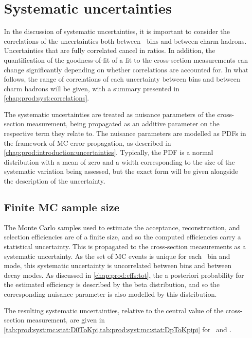 \chapter{Systematic uncertainties}
\label{chap:prod:syst}

In the discussion of systematic uncertainties, it is important to consider the 
correlations of the uncertainties both between \pTy\ bins and between charm 
hadrons.
Uncertainties that are fully correlated cancel in ratios.
In addition, the quantification of the goodness-of-fit of a fit to the 
cross-section measurements can change significantly depending on whether 
correlations are accounted for.
In what follows, the range of correlations of each uncertainty between bins and 
between charm hadrons will be given, with a summary presented in 
\cref{chap:prod:syst:correlations}.

The systematic uncertainties are treated as nuisance parameters of the 
cross-section measurement, being propagated as an additive parameter on the 
respective term they relate to.
The nuisance parameters are modelled as \aclp{PDF} in the framework of \acl{MC} 
error propagation, as described in \cref{chap:prod:introduction:uncertainties}.
Typically, the \ac{PDF} is a normal distribution with a mean of zero and a 
width corresponding to the size of the systematic variation being assessed, but 
the exact form will be given alongside the description of the uncertainty.

\section{Finite \acl{MC} sample size}
\label{chap:prod::syst:mcstat}

The Monte Carlo samples used to estimate the acceptance, reconstruction, and 
selection efficiencies are of a finite size, and so the computed efficiencies 
carry a statistical uncertainty.
This is propagated to the cross-section measurements as a systematic 
uncertainty.
As the set of \ac{MC} events is unique for each \pTy\ bin and mode, this 
systematic uncertainty is uncorrelated between bins and between decay modes.
As discussed in \cref{chap:prod:effs:tot}, the a posteriori probability for the 
estimated efficiency is described by the beta distribution, and so the 
corresponding nuisance parameter is also modelled by this distribution.

The resulting systematic uncertainties, relative to the central value of the 
cross-section measurement, are given in 
\cref{tab:prod:syst:mc:stat:D0ToKpi,tab:prod:syst:mc:stat:DpToKpipi} for 
\DzToKpi\ and \DpToKpipi.

